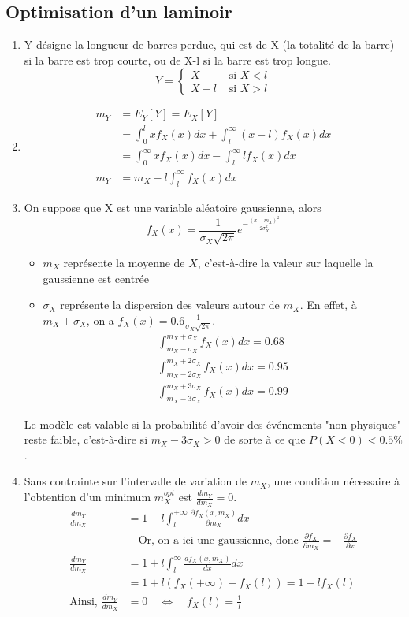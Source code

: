 \documentclass[main.tex]{subfiles}
\begin{document}
\subsection*{Optimisation d'un laminoir}

\begin{enumerate}
\item Y désigne la longueur de barres perdue, qui est de X (la totalité de la barre) si la barre est trop courte, ou de X-l si la barre est trop longue.
\[ 
Y = \left\{ 
\begin{array}{ll}
X & \text{ si } X < l \\
X-l & \text{ si } X >l 
\end{array}
\right.
\]

\item 
\begin{align*}
m_Y & = E_Y[Y] = E_X[Y] \\
& = \int_0^lxf_X(x)dx + \int_l^{\infty} (x-l)f_X(x)dx \\
& = \int_0^{\infty} xf_X(x)dx - \int_l^{\infty}lf_X(x)dx \\
m_Y & = m_X - l\int_l^{\infty}f_X(x)dx
\end{align*}

\item On suppose que X est une variable aléatoire gaussienne, alors \[f_X(x) = \frac{1}{\sigma_X\sqrt{2\pi}}e^{-\frac{(x-m_X)^2}{2\sigma_X^2}} \]
\begin{itemize}
\item $m_X$ représente la moyenne de $X$, c'est-à-dire la valeur sur laquelle la gaussienne est centrée
\item $\sigma_X$ représente la dispersion des valeurs autour de $m_X$. En effet, à $m_X \pm \sigma_X$, on a $f_X(x) = 0.6\frac{1}{\sigma_X\sqrt{2\pi}}$.
\begin{align*}
\int_{m_X-\sigma_X}^{m_X+\sigma_X} f_X(x)dx = 0.68 \\
\int_{m_X-2\sigma_X}^{m_X+2\sigma_X} f_X(x)dx = 0.95 \\
\int_{m_X-3\sigma_X}^{m_X+3\sigma_X} f_X(x)dx = 0.99
\end{align*}
\end{itemize}
Le modèle est valable si la probabilité d'avoir des événements "non-physiques" reste faible, c'est-à-dire si $m_X-3\sigma_X > 0$ de sorte à ce que $P(X<0) < 0.5 \%$.

\item Sans contrainte sur l'intervalle de variation de $m_X$, une condition nécessaire à l'obtention d'un minimum $m_X^{opt}$ est $\frac{dm_Y}{dm_X} = 0$.
\begin{align*}
\frac{dm_Y}{dm_X} &  = 1 - l\int_l^{+\infty} \frac{\partial f_X(x,m_X)}{\partial m_X}dx \\
&\quad \text{Or, on a ici une gaussienne, donc } \frac{\partial f_X}{\partial m_X} = - \frac{\partial f_X}{\partial x} \\
\frac{dm_Y}{dm_X} & = 1 + l\int_l^{\infty} \frac{df_X(x,m_X)}{dx}dx \\
& = 1 + l(f_X(+\infty)-f_X(l)) = 1 - lf_X(l) \\
\text{Ainsi, } \frac{dm_Y}{dm_X} & = 0 \quad \Leftrightarrow \quad  f_X(l) = \frac{1}{l} 
\end{align*}


\end{enumerate}
\end{document}

